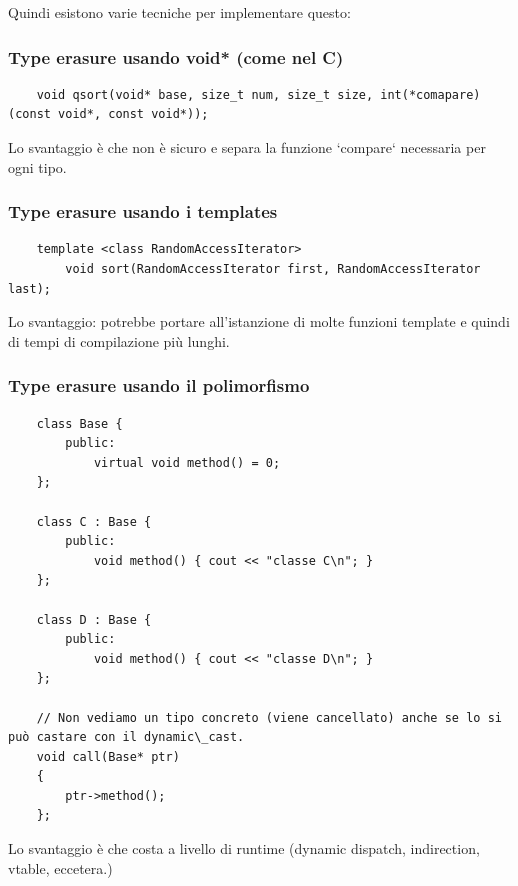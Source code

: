 \textsf{\small Quindi esistono varie tecniche per implementare questo: } \\

\subsubsection{Type erasure usando void* (come nel C)}

\begin{lstlisting}
	void qsort(void* base, size_t num, size_t size, int(*comapare)(const void*, const void*));
\end{lstlisting}

\textsf{\small Lo svantaggio è che non è sicuro e separa la funzione `compare` necessaria per ogni tipo.} \\

\subsubsection{Type erasure usando i templates}

\begin{lstlisting}
	template <class RandomAccessIterator>
		void sort(RandomAccessIterator first, RandomAccessIterator last);
\end{lstlisting}

\textsf{\small Lo svantaggio: potrebbe portare all'istanzione di molte funzioni template e quindi di tempi di compilazione più lunghi. } \\

\subsubsection{Type erasure usando il polimorfismo}

\begin{lstlisting}
	class Base { 
		public:
			virtual void method() = 0; 
	};
	
	class C : Base { 
		public:
			void method() { cout << "classe C\n"; } 
	};

	class D : Base { 
		public:
			void method() { cout << "classe D\n"; } 
	};
	
	// Non vediamo un tipo concreto (viene cancellato) anche se lo si può castare con il dynamic\_cast.
	void call(Base* ptr) 
	{ 
		ptr->method(); 
	};
\end{lstlisting}

\textsf{\small Lo svantaggio è che costa a livello di runtime (dynamic dispatch, indirection, vtable, eccetera.)} \\

